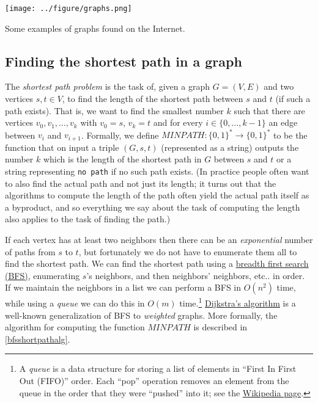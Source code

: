 \begin{marginfigure}
\centering
\texttt{[image: ../figure/graphs.png]}
\caption{Some examples of graphs found on the Internet.}
\label{graphsfromwebfig}
\end{marginfigure}

\subsection{Finding the shortest path in a
graph}\label{Finding-the-shortest-path}

The \emph{shortest path problem} is the task of, given a graph
\(G=(V,E)\) and two vertices \(s,t \in V\), to find the length of the
shortest path between \(s\) and \(t\) (if such a path exists). That is,
we want to find the smallest number \(k\) such that there are vertices
\(v_0,v_1,\ldots,v_k\) with \(v_0=s\), \(v_k=t\) and for every
\(i\in\{0,\ldots,k-1\}\) an edge between \(v_i\) and \(v_{i+1}\).
Formally, we define
\(\ensuremath{\mathit{MINPATH}}:\{0,1\}^* \rightarrow \{0,1\}^*\) to be
the function that on input a triple \((G,s,t)\) (represented as a
string) outputs the number \(k\) which is the length of the shortest
path in \(G\) between \(s\) and \(t\) or a string representing
\texttt{no path} if no such path exists. (In practice people often want
to also find the actual path and not just its length; it turns out that
the algorithms to compute the length of the path often yield the actual
path itself as a byproduct, and so everything we say about the task of
computing the length also applies to the task of finding the path.)

If each vertex has at least two neighbors then there can be an
\emph{exponential} number of paths from \(s\) to \(t\), but fortunately
we do not have to enumerate them all to find the shortest path. We can
find the shortest path using a
\href{https://en.wikipedia.org/wiki/Breadth-first_search}{breadth first
search (BFS)}, enumerating \(s\)'s neighbors, and then neighbors'
neighbors, etc.. in order. If we maintain the neighbors in a list we can
perform a BFS in \(O(n^2)\) time, while using a \emph{queue} we can do
this in \(O(m)\) time.\footnote{A \emph{queue} is a data structure for
  storing a list of elements in ``First In First Out (FIFO)'' order.
  Each ``pop'' operation removes an element from the queue in the order
  that they were ``pushed'' into it; see the
  \href{https://goo.gl/HY9BJD}{Wikipedia page}.}
\href{https://goo.gl/PJyc4D}{Dijkstra's algorithm} is a well-known
generalization of BFS to \emph{weighted} graphs. More formally, the
algorithm for computing the function \(\ensuremath{\mathit{MINPATH}}\)
is described in \cref{bfsshortpathalg}.

